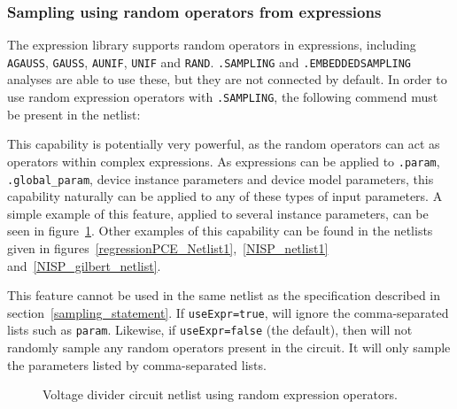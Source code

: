 \subsubsection{Sampling using random operators from expressions}

The \Xyce{} expression library supports random operators in expressions, 
including \texttt{AGAUSS}, \texttt{GAUSS}, \texttt{AUNIF}, \texttt{UNIF} and \texttt{RAND}.
\Xyce{} \texttt{.SAMPLING} and \texttt{.EMBEDDEDSAMPLING} analyses are able to use these, but they are not
connected by default.  In order to use random expression operators with \texttt{.SAMPLING}, 
the following commend must be present in the netlist:

This capability is potentially very powerful, as the random operators can 
act as operators within complex expressions.  
As expressions can be applied to \texttt{.param}, \texttt{.global\_param}, 
device instance parameters  and device model parameters, this capability 
naturally can be applied to any of these types of input parameters.
A simple example of this feature, applied to several instance parameters, 
can be seen in figure~\ref{Sampling_Netlist_4}.  Other examples of this capability can be found 
in the netlists given in figures~\ref{regressionPCE_Netlist1},~\ref{NISP_netlist1} 
and~\ref{NISP_gilbert_netlist}.

This feature cannot be used in the same netlist as the 
specification described in section~\ref{sampling_statement}.  If 
\texttt{useExpr=true}, \Xyce{} will ignore the comma-separated lists such as 
\texttt{param}.  Likewise, if \texttt{useExpr=false} (the default), then 
\Xyce{} will not randomly sample any random operators present in the circuit.  
It will only sample the parameters listed by comma-separated lists.

\begin{figure}[htbp]
  \fontsize{9pt}{10pt}
\begin{centering}
\caption{Voltage divider circuit netlist using random expression operators.
\label{Sampling_Netlist_4}}
\end{centering}
\end{figure}

